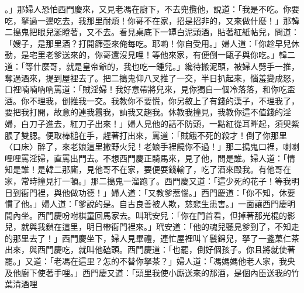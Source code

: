 。」那婦人恐怕西門慶來，又見老馮在廚下，不去兜攬他，說道：「我是不吃。你要吃，拏過一邊吃去，我那里耐煩！你哥不在家，招是招非的，又來做什麼！」那韓二搗鬼把眼兒涎瞪著，又不去。看見桌底下一罈白泥頭酒，貼著紅紙帖兒，問道：「嫂子，是那里酒？打開篩壺來俺每吃。耶喲！你自受用。」婦人道：「你趁早兒休動，是宅里老爹送來的，你哥還沒見哩！等他來家，有便倒一甌子與你吃。」韓二道：「等什麼哥，就是皇帝爺的，我也吃一鍾兒。」纔待搬泥頭，被婦人劈手一推，奪過酒來，提到屋裡去了。把二搗鬼仰八叉推了一交，半日扒起來，惱羞變成怒，口裡喃喃吶吶罵道：「賊淫婦！我好意帶將兒來，見你獨自一個冷落落，和你吃盃酒。你不理我，倒推我一交。我教你不要慌，你另敘上了有錢的漢子，不理我了，要把我打開，故意的連我囂我，訕我又趨我。休教我撞見，我教你這不值錢的淫婦，白刀子進去，紅刀子出來！」婦人見他的話不防頭，一點紅從耳畔起，須臾紫脹了雙腮。便取棒槌在手，趕著打出來，罵道：「賊餓不死的殺才！倒了你那里〈口床〉醉了，來老娘這里撒野火兒！老娘手裡饒你不過！」那二搗鬼口裡，喇喇哩哩罵淫婦，直罵出門去。不想西門慶正騎馬來，見了他，問是誰。婦人道：「情知是誰！是韓二那廝，見他哥不在家，要便耍錢輸了，吃了酒來毆我。有他哥在家，常時撞見打一頓。」那二搗鬼一溜跑了。西門慶又道：「這少死的花子！等我明日到衙門裡，與他做功德！」婦人道：「又教爹惹惱。」西門慶道：「你不知，休要慣了他。」婦人道：「爹說的是。自古良善被人欺，慈悲生患害。」一面讓西門慶明間內坐。西門慶吩咐棋童回馬家去。叫玳安兒：「你在門首看，但掉著那光棍的影兒，就與我鎖在這里，明日帶衙門裡來。」玳安道：「他的魂兒聽見爹到了，不知走的那里去了！」西門慶坐下，婦人見畢禮，連忙屋裡叫丫鬟錦兒，拏了一盞菓仁茶出來，與西門慶吃，就叫他磕頭。西門慶道：「也罷，倒好個孩子。你且將就使著罷。」又道：「老馮在這里？怎的不替你拏茶？」婦人道：「馮媽媽他老人家，我央及他廚下使著手哩。」西門慶又道：「頭里我使小廝送來的那酒，是個內臣送我的竹葉清酒哩 